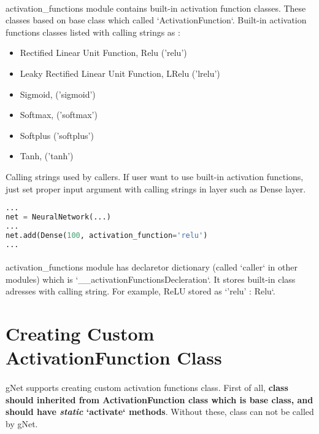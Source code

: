 \documentclass[12pt]{report}
\begin{document}
\paragraph{}
activation\_functions module contains built-in activation function classes. These classes based on base class which called `ActivationFunction`. Built-in activation functions classes listed with calling strings as : 

\begin{itemize}
	\item	Rectified Linear Unit Function, Relu ('relu')
	\item	Leaky Rectified Linear Unit Function, LRelu ('lrelu')
	\item	Sigmoid, ('sigmoid')
	\item	Softmax, ('softmax')
	\item	Softplus ('softplus')
	\item	Tanh, ('tanh')
\end{itemize}

Calling strings used by callers. If user want to use built-in activation functions, just set proper input argument with calling strings in layer such as Dense layer.

\begin{lstlisting}[language=Python, numbers=none, caption={Built-in activation function.}, 
label={lis:activation-built-in}]
...
net = NeuralNetwork(...)
...
net.add(Dense(100, activation_function='relu')
...
\end{lstlisting}

\paragraph{}
activation\_functions module has declaretor dictionary (called `caller` in other modules) which is `\_\_activationFunctionsDecleration`. It stores built-in class adresses with calling string. For example, ReLU stored as `'relu' : Relu`. 

\section{Creating Custom ActivationFunction Class}

\paragraph{}
gNet supports creating custom activation functions class. First of all, \textbf{class should inherited from ActivationFunction class which is base class, and should have \textit{static} `activate` methods}. Without these, class can not be called by gNet. 
\end{document}
